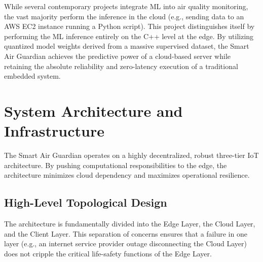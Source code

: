 \documentclass[12pt,journal,onecolumn,a4paper]{IEEEtran}
\begin{document}
While several contemporary projects integrate ML into air quality monitoring, the vast majority perform the inference in the cloud (e.g., sending data to an AWS EC2 instance running a Python script). This project distinguishes itself by performing the ML inference entirely on the C++ level at the edge. By utilizing quantized model weights derived from a massive supervised dataset, the Smart Air Guardian achieves the predictive power of a cloud-based server while retaining the absolute reliability and zero-latency execution of a traditional embedded system.

\section{System Architecture and Infrastructure}
The Smart Air Guardian operates on a highly decentralized, robust three-tier IoT architecture. By pushing computational responsibilities to the edge, the architecture minimizes cloud dependency and maximizes operational resilience.

\subsection{High-Level Topological Design}
The architecture is fundamentally divided into the Edge Layer, the Cloud Layer, and the Client Layer. This separation of concerns ensures that a failure in one layer (e.g., an internet service provider outage disconnecting the Cloud Layer) does not cripple the critical life-safety functions of the Edge Layer.
\end{document}
